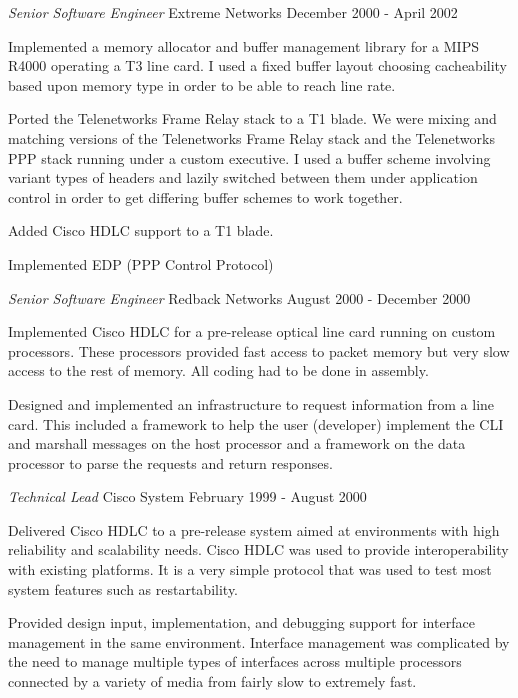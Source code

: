\documentclass[margin]{res}
\begin{document}
\begin{resume}
                {\sl\large Senior Software Engineer} Extreme Networks \hfill December 2000 - April 2002

                Implemented a memory allocator and buffer management library for a MIPS
                R4000 operating a T3 line card. I used a fixed buffer layout choosing
                cacheability based upon memory type in order to be able to reach line
                rate.

                Ported the Telenetworks Frame Relay stack to a T1 blade. We were mixing
                and matching versions of the Telenetworks Frame Relay stack and the
                Telenetworks PPP stack running under a custom executive. I used a buffer
                scheme involving variant types of headers and lazily switched between
                them under application control in order to get differing buffer schemes
                to work together.

                Added Cisco HDLC support to a T1 blade.

                Implemented EDP (PPP Control Protocol)

                {\sl\large Senior Software Engineer} Redback  Networks \hfill August 2000 - December 2000

                Implemented Cisco HDLC for a pre-release optical line card
                running on custom processors. These processors provided
                fast access to packet memory but very slow access to the
                rest of memory. All coding had to be done in assembly.

                Designed and implemented an infrastructure to request
                information from a line card. This included a framework to
                help the user (developer) implement the CLI and marshall
                messages on the host processor and a framework on the data
                processor to parse the requests and return responses.

                {\sl\large Technical Lead } Cisco System \hfill February 1999 - August 2000

                Delivered Cisco HDLC to a pre-release system aimed at environments with
                high reliability and scalability needs. Cisco HDLC was used to provide
                interoperability with existing platforms. It is a very simple protocol
                that was used to test most system features such as restartability.


                Provided design input, implementation, and debugging support for
                interface management in the same environment. Interface management was
                complicated by the need to manage multiple types of interfaces across
                multiple processors connected by a variety of media from fairly slow to
                extremely fast.


\end{resume}
\end{document}
